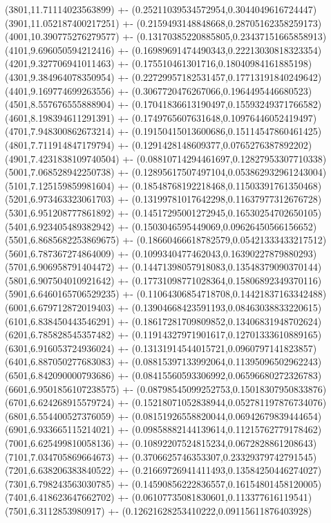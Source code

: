 {(3801,11.71114023563899) +- (0.25211039534572954,0.3044049616724447)
(3901,11.052187400217251) +- (0.2159493148848668,0.28705162358259173)
(4001,10.390775276279577) +- (0.13170385220885805,0.23437151665858913)
(4101,9.696050594212416) +- (0.16989691474490343,0.22213030818323354)
(4201,9.327706941011463) +- (0.175510461301716,0.18040984161885198)
(4301,9.384964078350954) +- (0.22729957182531457,0.17713191840249642)
(4401,9.169774699263556) +- (0.3067720476267066,0.1964495446680523)
(4501,8.557676555888904) +- (0.17041836613190497,0.15593249371766582)
(4601,8.198394611291391) +- (0.1749765607631648,0.10976446052419497)
(4701,7.948300862673214) +- (0.19150415013600686,0.15114547860461425)
(4801,7.711914847179794) +- (0.1291428148609377,0.0765276387892202)
(4901,7.4231838109740504) +- (0.08810714294461697,0.12827953307710338)
(5001,7.068528942250738) +- (0.12895617507497104,0.053862932961243004)
(5101,7.125159859981604) +- (0.18548768192218468,0.11503391761350468)
(5201,6.973463323061703) +- (0.13199781017642298,0.11637977312676728)
(5301,6.951208777861892) +- (0.14517295001272945,0.16530254702650105)
(5401,6.923405489382942) +- (0.1503046595449069,0.09626450566156652)
(5501,6.8685682253869675) +- (0.18660466618782579,0.05421333433217512)
(5601,6.787367274864009) +- (0.1099340477462043,0.16390227879880293)
(5701,6.906958791404472) +- (0.14471398057918083,0.13548379090370144)
(5801,6.907504010921642) +- (0.17731098771028364,0.15806892349370116)
(5901,6.6460165706529235) +- (0.11064306854718708,0.14421837163342488)
(6001,6.679712872019403) +- (0.13904668423591193,0.08463038833220615)
(6101,6.838450443546291) +- (0.18617281709809852,0.13406831948702624)
(6201,6.785828545357482) +- (0.11914327971901617,0.12701333610889165)
(6301,6.916053724936024) +- (0.13131914544015721,0.0960797141823857)
(6401,6.887050277683083) +- (0.08815397133992064,0.11395096502962243)
(6501,6.842090000793686) +- (0.08415560593306992,0.06596680272326783)
(6601,6.9501856107238575) +- (0.08798545099252753,0.15018307950833876)
(6701,6.624268915579724) +- (0.15218071052838944,0.052781197876734076)
(6801,6.554400527376059) +- (0.08151926558820044,0.06942679839444654)
(6901,6.933665115214021) +- (0.09858882144139614,0.11215762779178462)
(7001,6.625499810058136) +- (0.10892207524815234,0.0672828861208643)
(7101,7.034705869664673) +- (0.3706625746353307,0.23329379742791545)
(7201,6.638206383840522) +- (0.21669726941411493,0.13584250446274027)
(7301,6.798243563030785) +- (0.14590856222836557,0.16154801458120005)
(7401,6.418623647662702) +- (0.06107735081830601,0.113377616119541)
(7501,6.3112853980917) +- (0.12621628253410222,0.09115611876403928)
}
